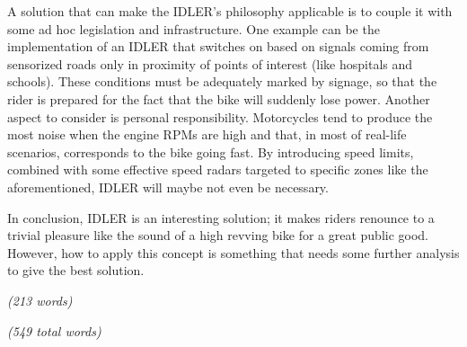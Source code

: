 A solution that can make the IDLER's philosophy applicable is to couple it with some ad hoc legislation and infrastructure.
One example can be the implementation of an IDLER that switches on based on signals coming from sensorized roads only in proximity of points of interest (like hospitals and schools). These conditions must be adequately marked by signage, so that the rider is prepared for the fact that the bike will suddenly lose power. Another aspect to consider is personal responsibility. Motorcycles tend to produce the most noise when the engine RPMs are high and that, in most of real-life scenarios, corresponds to the bike going fast. By introducing speed limits, combined with some effective speed radars targeted to specific zones like the aforementioned, IDLER will maybe not even be necessary.

In conclusion, IDLER is an interesting solution; it makes riders renounce to a trivial pleasure like the sound of a high revving bike for a great public good. However, how to apply this concept is something that needs some further analysis to give the best solution.

\emph{(213 words)}

\emph{(549 total words)}

